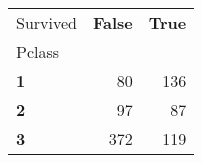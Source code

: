 \begin{tabular}{lrr}
\toprule
Survived & \textbf{False} & \textbf{True} \\
Pclass &  &  \\
\midrule
\textbf{1} & 80 & 136 \\
\textbf{2} & 97 & 87 \\
\textbf{3} & 372 & 119 \\
\bottomrule
\end{tabular}

